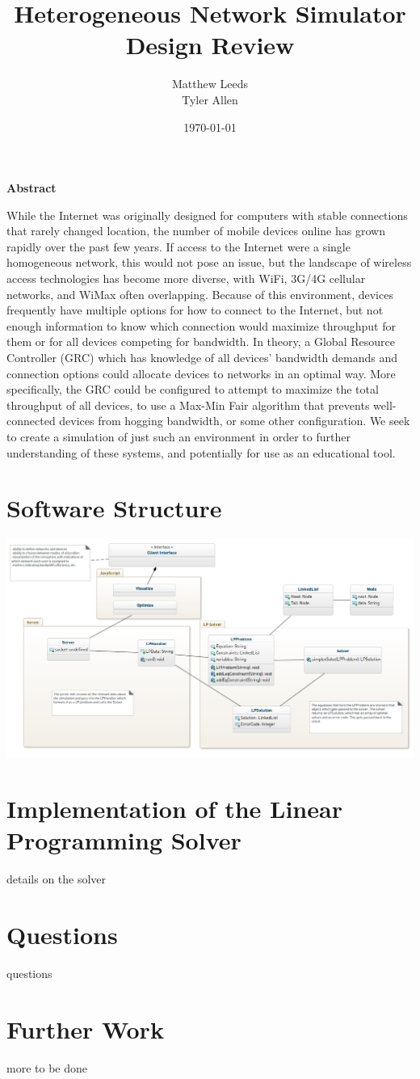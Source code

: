 \documentclass[11pt]{article}
\title{Heterogeneous Network Simulator Design Review}
\author{Matthew Leeds\\
	Tyler Allen\\}
\date{\today}
\begin{document}
\maketitle

\noindent \textbf{Abstract}

While the Internet was originally designed for computers with stable connections that rarely changed location, the number of mobile devices online has grown rapidly over the past few years. If access to the Internet were a single homogeneous network, this would not pose an issue, but the landscape of wireless access technologies has become more diverse, with WiFi, 3G/4G cellular networks, and WiMax often overlapping. Because of this environment, devices frequently have multiple options for how to connect to the Internet, but not enough information to know which connection would maximize throughput for them or for all devices competing for bandwidth. In theory, a Global Resource Controller (GRC) which has knowledge of all devices' bandwidth demands and connection options could allocate devices to networks in an optimal way. More specifically, the GRC could be configured to attempt to maximize the total throughput of all devices, to use a Max-Min Fair algorithm that prevents well-connected devices from hogging bandwidth, or some other configuration. We seek to create a simulation of just such an environment in order to further understanding of these systems, and potentially for use as an educational tool.

\section{Software Structure}

\begin{center}
\includegraphics[width=600px, angle=270]{model.png}
\end{center}

\section{Implementation of the Linear Programming Solver}

details on the solver

\section{Questions}

questions

\section{Further Work}

more to be done
\end{document}
